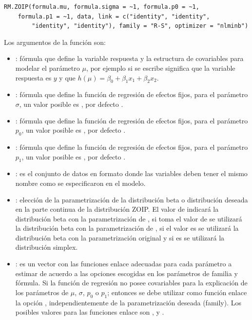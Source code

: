 \begin{verbatim}
RM.ZOIP(formula.mu, formula.sigma = ~1, formula.p0 = ~1, 
    formula.p1 = ~1, data, link = c("identity", "identity", 
        "identity", "identity"), family = "R-S", optimizer = "nlminb")
\end{verbatim}

Los argumentos de la funci\'{o}n  son:

\begin{itemize}[noitemsep, nolistsep]

\item {}: f\'{o}rmula que define la variable respuesta y la estructura de covariables para modelar el par\'{a}metro $\mu$, por ejemplo si se escribe  significa que la variable respuesta es $y$ y que $h(\mu)=\beta_0 + \beta_1 x_1 + \beta_2 x_2$.
\item {}: f\'{o}rmula que define la funci\'{o}n de regresi\'{o}n de efectos fijos, para el par\'{a}metro $\sigma$, un valor posible es , por defecto .
\item {}: f\'{o}rmula que define la funci\'{o}n de regresi\'{o}n de efectos fijos, para el par\'{a}metro $p_0$, un valor posible es , por defecto .
\item {}: f\'{o}rmula que define la funci\'{o}n de regresi\'{o}n de efectos fijos, para el par\'{a}metro $p_1$, un valor posible es , por defecto .
\item {}: es el conjunto de datos en formato  donde las variables deben tener el mismo nombre como se especificaron en el modelo.
\item {}: elecci\'{o}n de la parametrizaci\'{o}n de la distribuci\'{o}n beta o distribuci\'{o}n deseada en la parte continua de la distribuci\'{o}n ZOIP. El valor de  indicar\'{a} la distribuci\'{o}n beta con la parametrizaci\'{o}n de \cite{Stasinopoulos2}, si toma el valor de  se utilizar\'{a} la distribuci\'{o}n beta con la parametrizaci\'{o}n de \cite{Ferrari2}, si el valor es  se utilizar\'{a} la distribuci\'{o}n beta con la parametrizaci\'{o}n original y si es  se utilizar\'{a} la distribuci\'{o}n simplex.
\item {}: es un vector con las funciones enlace adecuadas para cada par\'{a}metro a estimar de acuerdo a las opciones escogidas en los par\'{a}metros de familia y f\'{o}rmula. Si la funci\'{o}n de regresi\'{o}n no posee covariables para la explicaci\'{o}n de los par\'{a}metros de $\mu$, $\sigma$, $p_0$ o $p_1$; entonces se debe utilizar como funci\'{o}n enlace la opci\'{o}n , independientemente de la parametrizaci\'{o}n deseada (family). Los posibles valores para las funciones enlace son ,  y .\\

\end{itemize}
